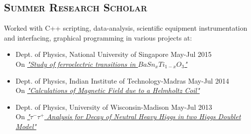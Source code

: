 \subsection*{\textsc{Summer Research Scholar}}
Worked with C++ scripting, data-analysis, scientific equipment instrumentation and interfacing, graphical programming in various projects at:
\begin{itemize}[noitemsep]

\item Dept. of Physics, National University of Singapore \hfill {May-Jul 2015}\\
On \href{http://syamalpraneeth.weebly.com/uploads/9/5/9/2/95928492/nus.pdf}{\emph{"Study of ferroelectric transitions in $BaSn_{x}Ti_{1-x}O_{3}$"}}

\item Dept. of Physics, Indian Institute of Technology-Madras \hfill {May-Jul 2014} \\
On \href{http://syamalpraneeth.weebly.com/uploads/9/5/9/2/95928492/iitm.pdf}{\emph{"Calculations of Magnetic Field due to a Helmholtz Coil"}} 

\item Dept. of Physics, University of Wisconsin-Madison \hfill {May-Jul 2013}\\
On \href{http://syamalpraneeth.weebly.com/uploads/9/5/9/2/95928492/uwm.pdf} {\emph{"$\tau^{-} \tau^{+}$ Analysis for Decay of Neutral Heavy Higgs in two Higgs Doublet Model"}} 

\end{itemize}

